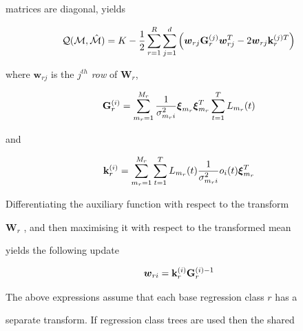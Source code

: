 matrices are diagonal, yields


\begin{eqnarray}


{\cal Q}({\cal M},{\hat{\cal M}}) = K


- \frac{1}{2}


\sum_{r=1}^R


\sum_{j=1}^d{


\left({\bm{w}}_{rj}{\bf G}^{(j)}_r{\bm{w}}^T_{rj} -2 {\bm{w}}_{rj}{\bf k}^{(j)T}_r


\right)} \nonumber


\end{eqnarray}


where ${\bm{w}}_{rj}$ is the $j^{th}$ {\em row} of $\bm{W}_r$,


\begin{eqnarray}


{\bf G}^{(i)}_r=\sum_{m_r=1}^{M_r}


\frac{1}{\sigma_{m_ri}^{2}}{\bm\xi}_{m_r}{\bm\xi}^{T}_{m_r}


\sum_{t=1}^T\like


\label{eq:gi_mllr}


\end{eqnarray}


and


\begin{eqnarray}


{\bf k}^{(i)}_{r} =  \sum_{m_r=1}^{M_r}\sum\limits_{t=1}^T


\like\frac{1}{\sigma^{2}_{m_ri}} 


o_i(t){\bm\xi}^{T}_{m_r}


\end{eqnarray}


Differentiating the auxiliary function with respect to the transform


${\bm W}_r$ , and then maximising it with respect to the transformed mean


yields the following update


\begin{eqnarray}


{{\bm{w}}}_{ri} = {\bf k}_r^{(i)}{\bf G}_r^{(i)-1} \label{eq:mllrmeansol}


\end{eqnarray}





The above expressions assume that each base regression class $r$ has a


separate transform. If regression class trees are used then the shared


